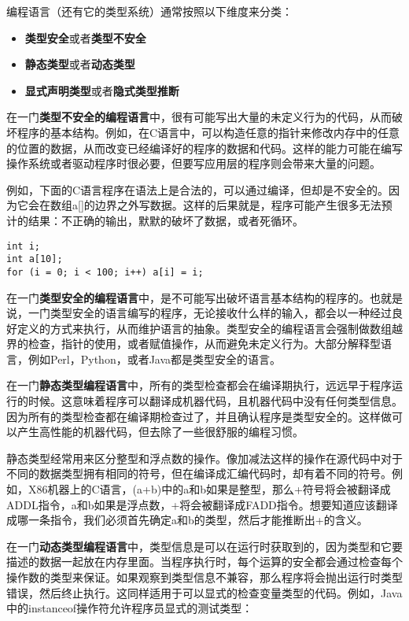 \documentclass[cn,11pt,chinese]{elegantbook}
\begin{document}
编程语言（还有它的类型系统）通常按照以下维度来分类：

\begin{itemize}
  \item \textbf{类型安全}或者\textbf{类型不安全}
  \item \textbf{静态类型}或者\textbf{动态类型}
  \item \textbf{显式声明类型}或者\textbf{隐式类型推断}
\end{itemize}

在一门\textbf{类型不安全的编程语言}中，很有可能写出大量的未定义行为的代码，从而破坏程序的基本结构。例如，在C语言中，可以构造任意的指针来修改内存中的任意的位置的数据，从而改变已经编译好的程序的数据和代码。这样的能力可能在编写操作系统或者驱动程序时很必要，但要写应用层的程序则会带来大量的问题。

例如，下面的C语言程序在语法上是合法的，可以通过编译，但却是不安全的。因为它会在数组a[]的边界之外写数据。这样的后果就是，程序可能产生很多无法预计的结果：不正确的输出，默默的破坏了数据，或者死循环。

\begin{verbatim}
int i;
int a[10];
for (i = 0; i < 100; i++) a[i] = i;
\end{verbatim}

在一门\textbf{类型安全的编程语言}中，是不可能写出破坏语言基本结构的程序的。也就是说，一门类型安全的语言编写的程序，无论接收什么样的输入，都会以一种经过良好定义的方式来执行，从而维护语言的抽象。类型安全的编程语言会强制做数组越界的检查，指针的使用，或者赋值操作，从而避免未定义行为。大部分解释型语言，例如Perl，Python，或者Java都是类型安全的语言。

在一门\textbf{静态类型编程语言}中，所有的类型检查都会在编译期执行，远远早于程序运行的时候。这意味着程序可以翻译成机器代码，且机器代码中没有任何类型信息。因为所有的类型检查都在编译期检查过了，并且确认程序是类型安全的。这样做可以产生高性能的机器代码，但去除了一些很舒服的编程习惯。

静态类型经常用来区分整型和浮点数的操作。像加减法这样的操作在源代码中对于不同的数据类型拥有相同的符号，但在编译成汇编代码时，却有着不同的符号。例如，X86机器上的C语言，(a+b)中的a和b如果是整型，那么+符号将会被翻译成ADDL指令，a和b如果是浮点数，+将会被翻译成FADD指令。想要知道应该翻译成哪一条指令，我们必须首先确定a和b的类型，然后才能推断出+的含义。

在一门\textbf{动态类型编程语言}中，类型信息是可以在运行时获取到的，因为类型和它要描述的数据一起放在内存里面。当程序执行时，每个运算的安全都会通过检查每个操作数的类型来保证。如果观察到类型信息不兼容，那么程序将会抛出运行时类型错误，然后终止执行。这同样适用于可以显式的检查变量类型的代码。例如，Java中的instanceof操作符允许程序员显式的测试类型：
\end{document}
